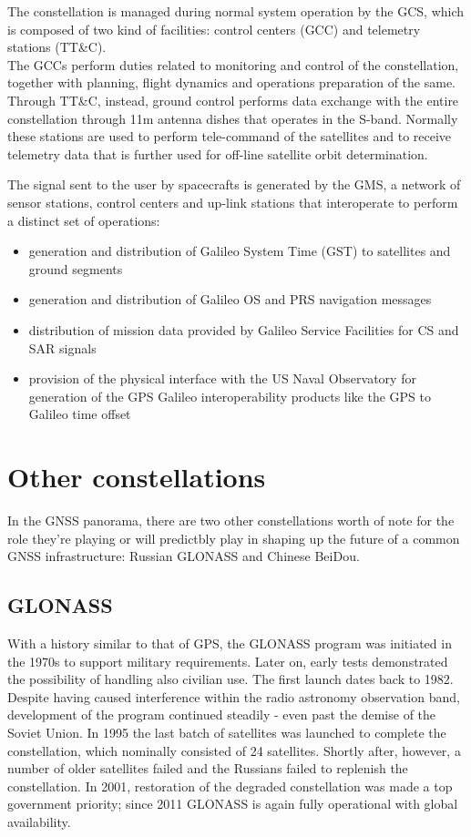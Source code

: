 The constellation is managed during normal system operation by the GCS, which is
composed of two kind of facilities: control centers (GCC) and telemetry stations
(TT\&C). \\
The GCCs perform duties related to monitoring and control of the
constellation, together with planning, flight dynamics and operations
preparation of the same.\\
Through TT\&C, instead, ground control performs data exchange with the entire
constellation through 11m antenna dishes that operates in the S-band. Normally
these stations are used to perform tele-command of the satellites and to receive
telemetry data that is further used for off-line satellite orbit determination.

The signal sent to the user by spacecrafts is generated by the GMS, a network of
sensor stations, control centers and up-link stations that interoperate to
perform a distinct set of operations:
\begin{itemize}
  \item generation and distribution of Galileo System Time (GST) to satellites
    and ground segments
  \item generation and distribution of Galileo OS and PRS navigation messages
  \item distribution of mission data provided by Galileo Service Facilities for
    CS and SAR signals
  \item provision of the physical interface with the US Naval Observatory for
    generation of the GPS Galileo interoperability products like the GPS to
    Galileo time offset
\end{itemize}

\section{Other constellations}
In the GNSS panorama, there are two other constellations worth of note for the
role they're playing or will predictbly play in shaping up the future of a
common GNSS infrastructure: Russian GLONASS and Chinese BeiDou.

\subsection{GLONASS}
With a history similar to that of GPS, the GLONASS program was initiated in the
1970s to support military requirements. Later on, early tests demonstrated the
possibility of handling also civilian use. The first launch dates back to 1982.
Despite having caused interference within the radio astronomy observation band,
development of the program continued steadily - even past the demise of the
Soviet Union. In 1995 the last batch of satellites was launched to complete the
constellation, which nominally consisted of 24 satellites. Shortly after,
however, a number of older satellites failed and the Russians failed to
replenish the constellation. In 2001, restoration of the degraded constellation
was made a top government priority; since 2011 GLONASS is again fully
operational with global availability.

